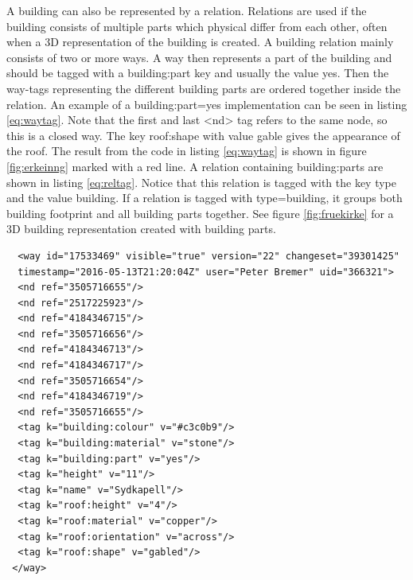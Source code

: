 A building can also be represented by a relation. Relations are used if the building consists of multiple parts which physical differ from each other, often when a 3D representation of the building is created. A building relation mainly consists of two or more ways. A way then represents a part of the building and should be tagged with a building:part key and usually the value yes. Then the way-tags representing the different building parts are ordered together inside the relation. An example of a building:part=yes implementation can be seen in listing \ref{eq:waytag}. Note that the first and last <nd> tag refers to the same node, so this is a closed way. The key roof:shape with value gable gives the appearance of the roof. The result from the code in listing \ref{eq:waytag} is shown in figure \ref{fig:erkeinng} marked with a red line. A relation containing building:parts are shown in listing \ref{eq:reltag}. Notice that this relation is tagged with the key type and the value building. If a relation is tagged with type=building, it groups both building footprint and all building parts together. See figure \ref{fig:fruekirke} for a 3D building representation created with building parts. 

\begin{lstlisting}
  <way id="17533469" visible="true" version="22" changeset="39301425" 
  timestamp="2016-05-13T21:20:04Z" user="Peter Bremer" uid="366321">
  <nd ref="3505716655"/>
  <nd ref="2517225923"/>
  <nd ref="4184346715"/>
  <nd ref="3505716656"/>
  <nd ref="4184346713"/>
  <nd ref="4184346717"/>
  <nd ref="3505716654"/>
  <nd ref="4184346719"/>
  <nd ref="3505716655"/>
  <tag k="building:colour" v="#c3c0b9"/>
  <tag k="building:material" v="stone"/>
  <tag k="building:part" v="yes"/>
  <tag k="height" v="11"/>
  <tag k="name" v="Sydkapell"/>
  <tag k="roof:height" v="4"/>
  <tag k="roof:material" v="copper"/>
  <tag k="roof:orientation" v="across"/>
  <tag k="roof:shape" v="gabled"/>
 </way>
\end{lstlisting}

